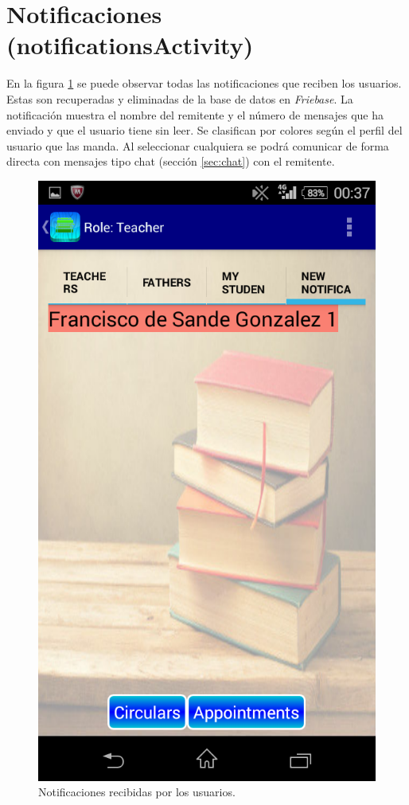 	\section{Notificaciones (notificationsActivity)} \label{sec:notifications}
	
		En la figura \ref{fig:notifications} se puede observar todas las notificaciones que reciben los usuarios. Estas son recuperadas y eliminadas de la base de datos en {\it Friebase}. La notificación muestra el nombre del remitente y el número de mensajes que ha enviado y que el usuario tiene sin leer. Se clasifican por colores según el perfil del usuario que las manda.
		Al seleccionar cualquiera se podrá comunicar de forma directa con mensajes tipo chat (sección \ref{sec:chat}) con el remitente.
	
		\begin{figure}[h !]
			\centering
			\includegraphics[scale=0.2]{Imagenes/App/Notifications}
			\caption{Notificaciones recibidas por los usuarios.}
			\label{fig:notifications}
		\end{figure}
	
